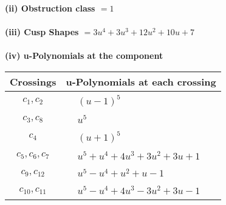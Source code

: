 \documentclass[1p]{elsarticle_modified}
\theoremstyle{definition}
\begin{document}
\flushleft \textbf{(ii) Obstruction class $= 1$}\\~\\
\flushleft \textbf{(iii) Cusp Shapes $= 3 u^4+3 u^3+12 u^2+10 u+7$}\\~\\
\newpage\renewcommand{\arraystretch}{1}
\flushleft \textbf{(iv) u-Polynomials at the component}\newline \\
\begin{tabular}{m{50pt}|m{274pt}}
Crossings & \hspace{64pt}u-Polynomials at each crossing \\
\hline $$\begin{aligned}c_{1},c_{2}\end{aligned}$$&$\begin{aligned}
&(u-1)^5
\end{aligned}$\\
\hline $$\begin{aligned}c_{3},c_{8}\end{aligned}$$&$\begin{aligned}
&u^5
\end{aligned}$\\
\hline $$\begin{aligned}c_{4}\end{aligned}$$&$\begin{aligned}
&(u+1)^5
\end{aligned}$\\
\hline $$\begin{aligned}c_{5},c_{6},c_{7}\end{aligned}$$&$\begin{aligned}
&u^5+u^4+4 u^3+3 u^2+3 u+1
\end{aligned}$\\
\hline $$\begin{aligned}c_{9},c_{12}\end{aligned}$$&$\begin{aligned}
&u^5- u^4+u^2+u-1
\end{aligned}$\\
\hline $$\begin{aligned}c_{10},c_{11}\end{aligned}$$&$\begin{aligned}
&u^5- u^4+4 u^3-3 u^2+3 u-1
\end{aligned}$\\
\hline
\end{tabular}\\~\\
\end{document}
